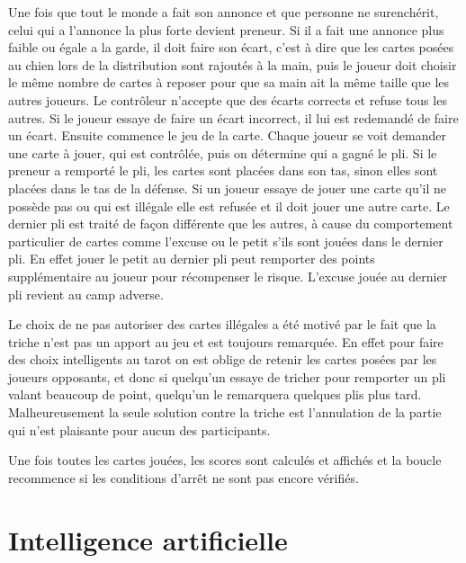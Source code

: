 \documentclass[a4paper]{report}
\begin{document}
			Une fois que tout le monde a fait son annonce et que personne ne surenchérit, celui qui a l'annonce la plus forte devient preneur. Si il a fait une annonce plus faible ou égale a 				la garde, il doit faire son écart, c’est à dire que les cartes posées au chien lors de la distribution sont rajoutés à la main, puis le joueur doit choisir le même nombre de 				cartes à reposer pour que sa main ait la même taille que les autres joueurs.
			Le contrôleur n’accepte que des écarts corrects et refuse tous les autres. Si le joueur essaye de faire un écart incorrect, il lui est redemandé de faire un écart.
			Ensuite commence le jeu de la carte. Chaque joueur se voit demander une carte à jouer, qui est contrôlée, puis on détermine qui a gagné le pli. Si le preneur a remporté le pli, les 				cartes sont placées dans son tas, sinon elles sont placées dans le tas de la défense. Si un joueur essaye de jouer une carte qu’il ne possède pas ou qui est illégale elle est 				refusée et il doit jouer une autre carte.
			Le dernier pli est traité de façon différente que les autres, à cause du comportement particulier de cartes comme l’excuse ou le petit s'ils sont jouées dans le dernier 			pli. En effet jouer le petit au dernier pli peut remporter des points supplémentaire au joueur pour récompenser le risque. L’excuse jouée au dernier pli revient au camp adverse.

			Le choix de ne pas autoriser des cartes illégales a été motivé par le fait que la triche n’est pas un apport au jeu et est toujours remarquée. En effet pour faire des choix 				intelligents au tarot on est oblige de retenir les cartes posées par les joueurs opposants, et donc si quelqu’un essaye de tricher pour remporter un pli valant beaucoup de 				point, quelqu’un le remarquera quelques plis plus tard. Malheureusement la seule solution contre la triche est l’annulation de la partie qui n’est plaisante pour aucun des 				participants.

			Une fois toutes les cartes jouées, les scores sont calculés et affichés et la boucle recommence si les conditions d'arrêt ne sont pas encore vérifiés.
	\section{Intelligence artificielle}
\end{document}
